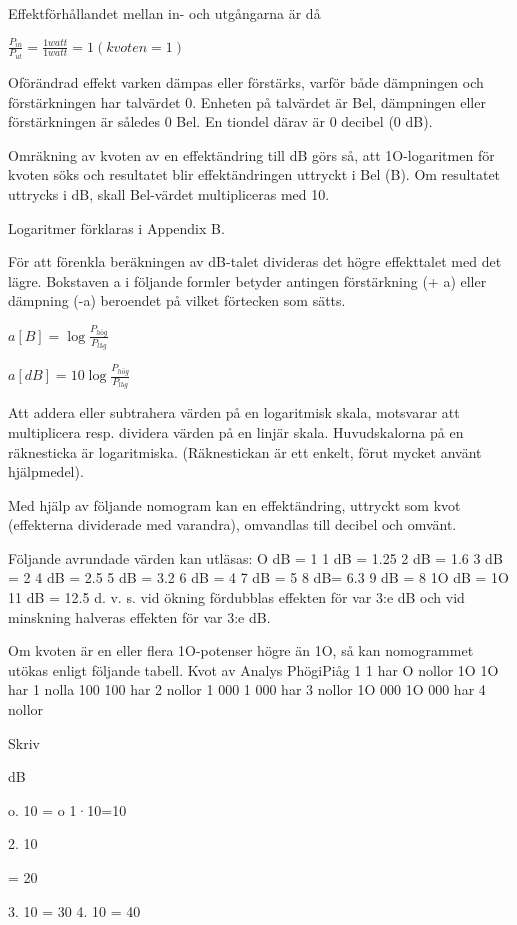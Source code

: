 Effektförhållandet mellan in- och utgångarna är då

$\frac{P_{in}}{P_{ut}} = \frac{1 watt}{1 watt} = 1 (kvoten = 1)$

Oförändrad effekt varken dämpas eller förstärks, varför både dämpningen och
förstärkningen har talvärdet 0. Enheten på talvärdet är Bel, dämpningen eller
förstärkningen är således 0 Bel. En tiondel därav är 0 decibel (0 dB).

Omräkning av kvoten av en effektändring till dB görs så, att 1O-logaritmen för
kvoten söks och resultatet blir effektändringen uttryckt i Bel (B). Om
resultatet uttrycks i dB, skall Bel-värdet multipliceras med 10.

Logaritmer förklaras i Appendix B.

För att förenkla beräkningen av dB-talet divideras det högre effekttalet med det
lägre. Bokstaven a i följande formler betyder antingen förstärkning (+ a) eller
dämpning (-a) beroendet på vilket förtecken som sätts.


$a[B] = \log \frac{P_{hög}}{P_{låg}}$

$a[dB] = 10\log \frac{P_{hög}}{P_{låg}}$

Att addera eller subtrahera värden på en logaritmisk skala, motsvarar att
multiplicera resp. dividera värden på en linjär skala. Huvudskalorna på en
räknesticka är logaritmiska. (Räknestickan är ett enkelt, förut mycket använt
hjälpmedel).

Med hjälp av följande nomogram kan en effektändring, uttryckt som kvot
(effekterna dividerade med varandra), omvandlas till decibel och omvänt.



Följande avrundade värden kan utläsas:
O dB = 1
1 dB = 1.25 2 dB = 1.6
3 dB = 2
4 dB = 2.5
5 dB = 3.2
6 dB = 4
7 dB = 5
8 dB= 6.3
9 dB = 8
1O dB = 1O 11 dB = 12.5
d. v. s. vid ökning fördubblas effekten för var
3:e dB och vid minskning halveras effekten
för var 3:e dB.

Om kvoten är en eller flera 1O-potenser
högre än 1O, så kan nomogrammet utökas
enligt följande tabell.
Kvot av Analys
PhögiPiåg
1
1 har O nollor
1O
1O har 1 nolla
100
100 har 2 nollor
1 000
1 000 har 3 nollor
1O 000 1O 000 har 4 nollor

Skriv

dB

o. 10 = o
1·10=10

2. 10

= 20

3. 10 = 30
4. 10 = 40

